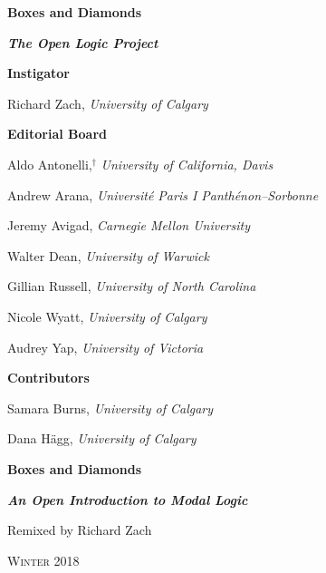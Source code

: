 

\pagestyle{empty}

\vspace*{100pt}

\begin{raggedleft}

{\fontsize{24pt}{24pt}\selectfont\bfseries\sffamily%
Boxes and Diamonds}

\end{raggedleft}


\newpage


\vspace*{100pt}

{\bfseries\itshape The Open Logic Project}

\bigskip

\textbf{\color{leadbeater}Instigator}

\medskip

Richard Zach, \emph{University of Calgary}

\bigskip

\textbf{\color{leadbeater}Editorial Board}

\medskip

Aldo Antonelli,$^\dagger$ \emph{University of California, Davis}

Andrew Arana, \emph{Universit\'e Paris I Panth\'enon--Sorbonne}

Jeremy Avigad, \emph{Carnegie Mellon University}

Walter Dean, \emph{University of Warwick}

Gillian Russell, \emph{University of North Carolina}

Nicole Wyatt, \emph{University of Calgary}

Audrey Yap, \emph{University of Victoria}

\bigskip

\textbf{\color{leadbeater}Contributors}

\medskip

Samara Burns, \emph{University of Calgary}

Dana H\"agg, \emph{University of Calgary}

\newpage


\vspace*{100pt}

\begin{raggedleft}

{\fontsize{24pt}{24pt}\selectfont\bfseries\sffamily%
Boxes and Diamonds}

\bigskip

{\fontsize{18pt}{18pt}\selectfont\bfseries\itshape An Open Introduction to Modal Logic}

\vspace{100pt}

\fontsize{14pt}{14pt}\selectfont Remixed by Richard Zach

\vfill

\textsc{Winter 2018}

\end{raggedleft}



